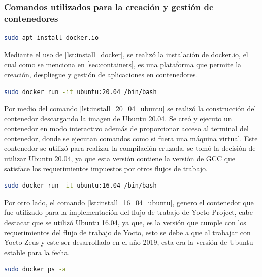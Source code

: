 \subsubsection{Comandos utilizados para la creación y gestión de contenedores}\label{subsec:manejo_de_contenedores}


\begin{lstlisting}[language=bash, caption={Instalacion de docker, Linux}, label=lst:install_docker]
    sudo apt install docker.io
\end{lstlisting}

Mediante el uso de \ref{lst:install_docker}, se realizó la instalación de docker.io, el cual como se menciona en \ref{sec:containers}, es una plataforma que permite la creación, despliegue y gestión de aplicaciones en contenedores. 

\begin{lstlisting}[language=bash, caption={Instalacion de Ubuntu 20.04, Linux}, label=lst:install_20_04_ubuntu]
    sudo docker run -it ubuntu:20.04 /bin/bash
\end{lstlisting}

Por medio del comando \ref{lst:install_20_04_ubuntu} se realizó la construcción del contenedor descargando la imagen de Ubuntu 20.04. Se creó y ejecuto un contenedor en modo interactivo además de proporcionar acceso al terminal del contenedor, donde se ejecutan comandos como si fuera una máquina virtual. Este contenedor se utilizó para realizar la compilación cruzada, se tomó la decisión de utilizar Ubuntu 20.04, ya que esta versión contiene la versión de GCC que satisface los requerimientos impuestos por otros flujos de trabajo.

\begin{lstlisting}[language=bash, caption={Instalacion de Ubuntu 16.04, Linux}, label=lst:install_16_04_ubuntu]
    sudo docker run -it ubuntu:16.04 /bin/bash
\end{lstlisting}

Por otro lado, el comando \ref{lst:install_16_04_ubuntu}, genero el contenedor que fue utilizado para la implementación del flujo de trabajo de Yocto Project, cabe destacar que se utilizó Ubuntu 16.04, ya que, es la versión que cumple con los requerimientos del flujo de trabajo de Yocto, esto se debe a que al trabajar con Yocto Zeus y este ser desarrollado en el año 2019, esta era la versión de Ubuntu estable para la fecha. 

\begin{lstlisting}[language=bash, caption={Lista de contenedores del sistema, Docker}, label=lst:docker_basics_ps-a]
    sudo docker ps -a
\end{lstlisting}


